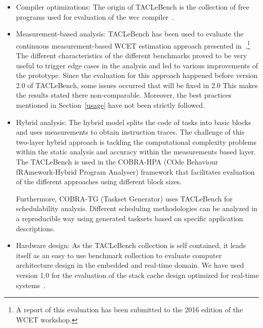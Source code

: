 \documentclass[a4paper,UKenglish]{oasics}
\newcommand{\todo}[1]{{\emph{TODO: #1}}}
\newcommand{\martin}[1]{{\color{blue} Martin: #1}}
\renewcommand{\todo}[1]{}
\renewcommand{\martin}[1]{}
\begin{document}
\begin{itemize}
\item Compiler optimizations: The origin of TACLeBench is the collection of free
programs used for evaluation of the wcc compiler~\cite{falk:wcc:wcet06}.
\item Measurement-based analysis: TACLeBench has been used to evaluate the continuous measurement-based WCET estimation approach presented
in~\cite{Dreyer2015}.\footnote{A report of this evaluation has been submitted to the 2016 edition of the WCET workshop.}
The different characteristics of the different benchmarks proved to be very useful to trigger edge cases in the analysis and led to various improvements of the prototype.
Since the evaluation for this approach happened before version 2.0 of TACLeBench,
some issues occurred that will be fixed in 2.0
This makes the results stated there non-comparable.
Moreover, the best practices mentioned in Section~\ref{usage} have not been strictly followed.
\martin{I am having a hard time understanding the (original) text on hybrid analysis.
What are the two layers? 
Anyway I try to rewrite and cutdown. We need to discuss this for the final version.}
\item Hybrid analysis: The hybrid model splits the code of tasks into basic blocks
and uses measurements to obtain instruction traces.
The  challenge  of  this  two-layer  hybrid  approach  is  tackling the computational complexity problems within the static analysis and accuracy  within  the  measurements based  layer.
The TACLeBench is used in the COBRA-HPA (COde Behaviour fRAmework-Hybrid Program Analyser) framework that facilitates evaluation of the different approaches using different block sizes.
\martin{We need a link or paper for the above. I did not find anything just with Google.}
Furthermore, COBRA-TG (Taskset Generator) uses TACLeBench for schedulability analysis.
Different scheduling methodologies can be analyzed in a reproducible way using generated
tasksets based on specific application descriptions.
\item Hardware design: As the TACLeBench collection is self contained, it leads itself
as an easy to use benchmark collection to evaluate computer architecture design in the
embedded and real-time domain. We have used version 1.0 for the evaluation of the
stack cache design optimized for real-time systems~\cite{patmos:stackcache:rts}.


\end{itemize}
\end{document}
